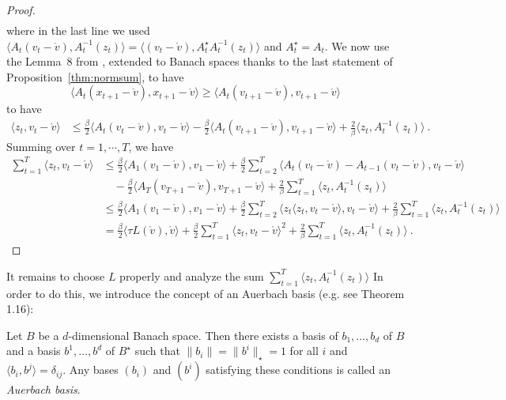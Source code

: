\documentclass[12pt]{colt2018} %
\renewcommand{\v}{\mathring{v}}
\begin{document}
\begin{proof}
\begin{align*}
\end{align*}
where in the last line we used $\langle A_{t}(v_t - \v), A^{-1}_{t}(z_t)\rangle=\langle (v_t - \v), A_t^\star A^{-1}_{t}(z_t)\rangle$ and $A_t^\star = A_t$.
We now use the Lemma~8 from \cite{hazan2007logarithmic}, extended to Banach spaces thanks to the last statement of Proposition~\ref{thm:normsum}, to have
\[
\langle A_{t}(x_{t+1} - \v),x_{t+1} - \v\rangle \geq \langle A_{t}(v_{t+1} - \v),v_{t+1} - \v\rangle
\]
to have
\begin{align*}
\langle z_t, v_t - \v\rangle 
&\leq \frac{\beta}{2} \langle A_{t}(v_t - \v), v_t - \v\rangle - \frac{\beta}{2} \langle A_{t}(v_{t+1} - \v),v_{t+1} - \v\rangle   + \frac{2}{\beta} \langle z_t,  A^{-1}_{t}(z_t)\rangle~.
\end{align*}
Summing over $t=1,\cdots,T$, we have
\begin{align*}
\sum_{t=1}^T \langle z_t, v_t - \v\rangle 
&\leq \frac{\beta}{2} \langle A_{1}(v_1 - \v), v_1 - \v\rangle + \frac{\beta}{2}\sum_{t=2}^T \langle A_{t}(v_t - \v) -A_{t-1}(v_t - \v), v_t - \v\rangle \\
&\quad - \frac{\beta}{2} \langle A_{T}(v_{T+1} - \v),v_{T+1} - \v\rangle   + \frac{2}{\beta} \sum_{t=1}^T \langle z_t,  A^{-1}_{t}(z_t)\rangle \\
&\leq \frac{\beta}{2} \langle A_{1}(v_1 - \v), v_1 - \v\rangle +\frac{\beta}{2}\sum_{t=2}^T \langle z_t \langle z_t, v_t - \v\rangle , v_t - \v\rangle + \frac{2}{\beta} \sum_{t=1}^T \langle z_t,  A^{-1}_{t}(z_t)\rangle\\
&= \frac{\beta}{2} \langle \tau L(\v), \v\rangle +\frac{\beta}{2}\sum_{t=1}^T \langle z_t , v_t - \v\rangle^2 + \frac{2}{\beta} \sum_{t=1}^T \langle z_t,  A^{-1}_{t}(z_t)\rangle~.
\end{align*}
\end{proof}

It remains to choose $L$ properly and analyze the sum $\sum_{t=1}^T \langle z_t,  A^{-1}_{t}(z_t)\rangle$ In order to do this, we introduce the concept of an Auerbach basis (e.g. see \citep{hajek2007biorthogonal} Theorem 1.16):
\begin{theorem}\label{thm:auerbachexists}
Let $B$ be a $d$-dimensional Banach space. Then there exists a basis of $b_1,\dots,b_d$ of $B$ and a basis $b^1,\dots,b^d$ of $B^\star$ such that $\|b_i\|=\|b^i\|_\star=1$ for all $i$ and $\langle b_i, b^j\rangle = \delta_{ij}$. Any bases $(b_i)$ and $(b^i)$ satisfying these conditions is called an \emph{Auerbach basis}.
\end{theorem}
\end{document}
